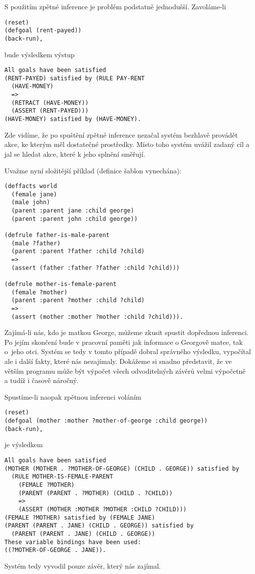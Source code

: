 S použitím zpětné inference je problém podstatně jednodušší. Zavoláme-li
\begin{verbatim}
(reset)
(defgoal (rent-payed))
(back-run),
\end{verbatim}
bude výsledkem výstup
\begin{verbatim}
All goals have been satisfied
(RENT-PAYED) satisfied by (RULE PAY-RENT
  (HAVE-MONEY)
  =>
  (RETRACT (HAVE-MONEY))
  (ASSERT (RENT-PAYED)))
(HAVE-MONEY) satisfied by (HAVE-MONEY).
\end{verbatim}
Zde vidíme, že po spuštění zpětné inference nezačal systém bezhlavě provádět
akce, ke kterým měl dostatečné prostředky. Místo toho systém uvážil zadaný cíl a
jal se hledat akce, které k jeho splnění směřují.

Uvažme nyní složitější příklad (definice šablon vynechána):
\begin{verbatim}
(deffacts world
  (female jane)
  (male john)
  (parent :parent jane :child george)
  (parent :parent john :child george))

(defrule father-is-male-parent
  (male ?father)
  (parent :parent ?father :child ?child)
  =>
  (assert (father :father ?father :child ?child)))

(defrule mother-is-female-parent
  (female ?mother)
  (parent :parent ?mother :child ?child)
  =>
  (assert (mother :mother ?mother :child ?child))).
\end{verbatim}
Zajímá-li nás, kdo je matkou George, můžeme zkusit spustit dopřednou inferenci.
Po jejím skončení bude v pracovní paměti jak informace o Georgově matce, tak
o~jeho otci. Systém se tedy v tomto případě dobral správného výsledku, vypočítal
ale i další fakty, které nás nezajímaly. Dokážeme si snadno představit, že ve
větším programu může být výpočet všech odvoditelných závěrů velmi výpočetně
a tudíž i časově náročný.

Spustíme-li naopak zpětnou inferenci voláním
\begin{verbatim}
(reset)
(defgoal (mother :mother ?mother-of-george :child george))
(back-run),
\end{verbatim}
je výsledkem
\begin{verbatim}
All goals have been satisfied
(MOTHER (MOTHER . ?MOTHER-OF-GEORGE) (CHILD . GEORGE)) satisfied by
  (RULE MOTHER-IS-FEMALE-PARENT
    (FEMALE ?MOTHER)
    (PARENT (PARENT . ?MOTHER) (CHILD . ?CHILD))
    =>
    (ASSERT (MOTHER :MOTHER ?MOTHER :CHILD ?CHILD)))
(FEMALE ?MOTHER) satisfied by (FEMALE JANE)
(PARENT (PARENT . JANE) (CHILD . GEORGE)) satisfied by
  (PARENT (PARENT . JANE) (CHILD . GEORGE))
These variable bindings have been used:
((?MOTHER-OF-GEORGE . JANE)).
\end{verbatim}
Systém tedy vyvodil pouze závěr, který nás zajímal.

